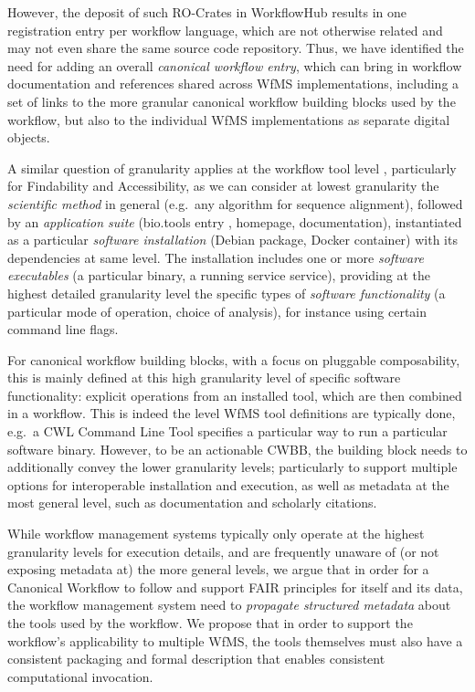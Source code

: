 However, the deposit of such RO-Crates in WorkflowHub results in one registration entry per workflow language, which are not otherwise related and may not even share the same source code repository.
Thus, we have identified the need for adding an overall \emph{canonical workflow entry}, which can bring in workflow documentation and references shared across WfMS implementations, including a set of links to the more granular canonical workflow building blocks used by the workflow, but also to the individual WfMS implementations as separate digital objects.

A similar question of granularity applies at the workflow tool level \cite{Möller 2017}, particularly for Findability and Accessibility, as we can consider at lowest granularity the \emph{scientific method} in general (e.g.~any algorithm for sequence alignment), followed by an \emph{application suite} (bio.tools entry \cite{Ison 2021}, homepage, documentation), instantiated as a particular \emph{software installation} (Debian package, Docker container) with its dependencies at same level.
The installation includes one or more \emph{software executables} (a particular binary, a running service service), providing at the highest detailed granularity level the specific types of \emph{software functionality} (a particular mode of operation, choice of analysis), for instance using certain command line flags.

For canonical workflow building blocks, with a focus on pluggable composability, this is mainly defined at this high granularity level of specific software functionality: explicit operations from an installed tool, which are then combined in a workflow.
This is indeed the level WfMS tool definitions are typically done, e.g.~a CWL Command Line Tool specifies a particular way to run a particular software binary.
However, to be an actionable CWBB, the building block needs to additionally convey the lower granularity levels; particularly to support multiple options for interoperable installation and execution, as well as metadata at the most general level, such as documentation and scholarly citations.

While workflow management systems typically only operate at the highest granularity levels for execution details, and are frequently unaware of (or not exposing metadata at) the more general levels, we argue that in order for a Canonical Workflow \cite{CWFR 2021} to follow and support FAIR principles for itself and its data, the workflow management system need to \emph{propagate structured metadata} about the tools used by the workflow.
We propose that in order to support the workflow's applicability to multiple WfMS, the tools themselves must also have a consistent packaging and formal description that enables consistent computational invocation.

